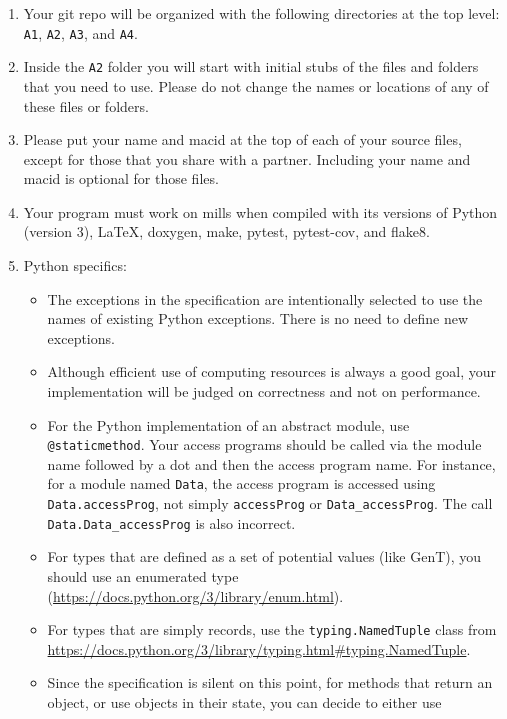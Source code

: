\documentclass[12pt]{article}
\begin{document}
\begin{enumerate}
\item Your git repo will be organized with the following directories at the
  top level: {\tt A1}, {\tt A2}, {\tt A3}, and {\tt A4}. 
\item Inside the {\tt A2} folder you will start with initial stubs of the files
  and folders that you need to use.  Please do not change the names or locations
  of any of these files or folders.
\item Please put your name and macid at the top of each of your source
  files, except for those that you share with a partner.  Including your name
  and macid is optional for those files.
\item Your program must work on mills when compiled with its versions of Python
  (version 3), LaTeX, doxygen, make, pytest, pytest-cov, and flake8.
\item Python specifics:
\begin{itemize}
\item The exceptions in the specification are intentionally selected to use the
  names of existing Python exceptions.  There is no need to define new
  exceptions.
\item Although efficient use of computing resources is always a good goal, your
  implementation will be judged on correctness and not on performance.
\item For the Python implementation of an abstract module, use
  \texttt{@staticmethod}.  Your access programs should be called via the module
  name followed by a dot and then the access program name.  For instance, for a
  module named \texttt{Data}, the access program is accessed using
  \texttt{Data.accessProg}, not simply \texttt{accessProg} or
  \texttt{Data\_accessProg}.  The call \texttt{Data.Data\_accessProg} is also
  incorrect.
\item For types that are defined as a set of potential values (like GenT), you
  should use an enumerated type
  (\href{https://docs.python.org/3/library/enum.html}
  {https://docs.python.org/3/library/enum.html}).
\item For types that are simply records, use the \texttt{typing.NamedTuple}
  class from
  \href{https://docs.python.org/3/library/typing.html#typing.NamedTuple}
  {https://docs.python.org/3/library/typing.html\#typing.NamedTuple}.
\item Since the specification is silent on this point, for methods that return
  an object, or use objects in their state, you can decide to either use

\end{itemize}
\end{enumerate}
\end{document}
